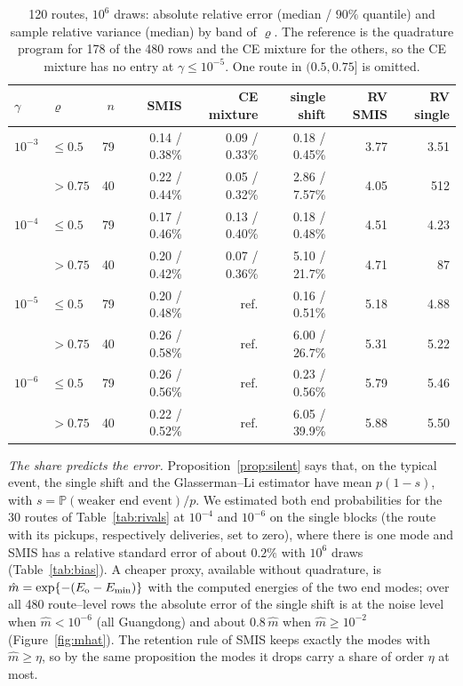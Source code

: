 \documentclass[pdflatex,sn-mathphys-ay]{sn-jnl}%
\theoremstyle{thmstyleone}%
\theoremstyle{thmstylethree}%
\theoremstyle{thmstyletwo}%
\renewcommand{\P}{\mathbb{P}}
\begin{document}
\begin{table}[t]
\centering\footnotesize
\caption{120 routes, $10^6$ draws: absolute relative error (median / $90\%$ quantile)
and sample relative variance (median) by band of $\varrho$. The reference is the
quadrature program for 178 of the 480 rows and the CE mixture for the others, so the CE
mixture has no entry at $\gamma\le10^{-5}$. One route in $(0.5,0.75]$ is omitted.}
\label{tab:routes}
\begin{tabular}{llrrrrrr}
\toprule
$\gamma$ & $\varrho$ & $n$ & SMIS & CE mixture & single shift & RV SMIS & RV single \\
\midrule
$10^{-3}$ & $\le0.5$ & 79 & 0.14 / 0.38\% & 0.09 / 0.33\% & 0.18 / 0.45\% & 3.77 & 3.51 \\
          & $>0.75$  & 40 & 0.22 / 0.44\% & 0.05 / 0.32\% & 2.86 / 7.57\% & 4.05 & 512 \\
$10^{-4}$ & $\le0.5$ & 79 & 0.17 / 0.46\% & 0.13 / 0.40\% & 0.18 / 0.48\% & 4.51 & 4.23 \\
          & $>0.75$  & 40 & 0.20 / 0.42\% & 0.07 / 0.36\% & 5.10 / 21.7\% & 4.71 & 87 \\
$10^{-5}$ & $\le0.5$ & 79 & 0.20 / 0.48\% & ref. & 0.16 / 0.51\% & 5.18 & 4.88 \\
          & $>0.75$  & 40 & 0.26 / 0.58\% & ref. & 6.00 / 26.7\% & 5.31 & 5.22 \\
$10^{-6}$ & $\le0.5$ & 79 & 0.26 / 0.56\% & ref. & 0.23 / 0.56\% & 5.79 & 5.46 \\
          & $>0.75$  & 40 & 0.22 / 0.52\% & ref. & 6.05 / 39.9\% & 5.88 & 5.50 \\
\bottomrule
\end{tabular}
\end{table}

\emph{The share predicts the error.} Proposition~\ref{prop:silent} says that, on the
typical event, the single shift and the Glasserman--Li estimator have mean
$p(1-s)$, with $s=\P(\text{weaker end event})/p$. We estimated both end probabilities for the 30 routes of
Table~\ref{tab:rivals} at $10^{-4}$ and $10^{-6}$ on the single blocks (the route with its
pickups, respectively deliveries, set to zero), where there is one mode and SMIS has a
relative standard error of about $0.2\%$ with $10^6$ draws (Table~\ref{tab:bias}). 
A cheaper proxy, available without quadrature, is
$\hat m=\exp\{-(E_{\rm o}-E_{\min})\}$ with the computed energies of the two end modes; over
all 480 route--level rows the absolute error of the single shift is at the noise level
when $\hat m<10^{-6}$ (all Guangdong) and about $0.8\,\hat m$ when $\hat m\ge10^{-2}$
(Figure~\ref{fig:mhat}). The retention rule of SMIS keeps exactly the modes with
$\hat m\ge\eta$, so by the same proposition the modes it drops carry a share of order
$\eta$ at most.
\end{document}
